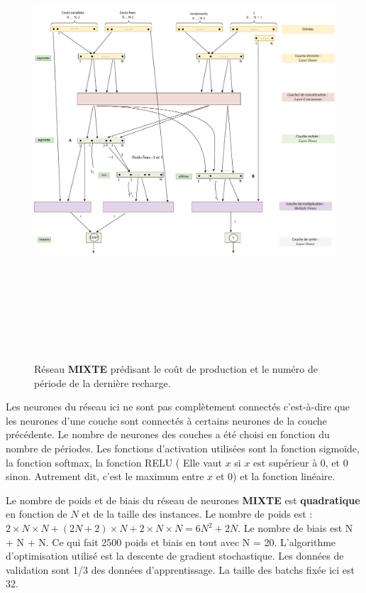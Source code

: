 \begin{figure}[H]
	\centerline{
		\includegraphics[height=17cm]{images_these/FNFC.pdf}}
	\caption[Réseau MIXTE]{Réseau \textbf{MIXTE} prédisant le coût de production et le numéro de période de la dernière recharge.}
	\label{FNFC}
\end{figure}
Les neurones du réseau ici ne sont pas complètement connectés c'est-à-dire que les neurones d'une couche sont connectés à certains neurones de la couche précédente. Le nombre de neurones des couches a été choisi en fonction du nombre de périodes. Les fonctions d'activation utilisées sont la fonction sigmoïde, la fonction softmax, la fonction RELU ( Elle vaut $x$ si $x$ est supérieur à 0, et 0 sinon. Autrement dit, c'est le maximum entre $x$ et 0) et la fonction linéaire. 


Le nombre de poids et de biais du réseau de neurones \textbf{MIXTE} est \textbf{quadratique } en fonction de $N$ et de la taille des instances. Le nombre de poids est : $2\times N\times N + (2N+2)\times N + 2\times N \times N=6N^2+2N$. Le nombre de biais est N + N + N. Ce qui fait 2500 poids et biais en tout avec N = 20.
 L'algorithme d'optimisation utilisé est la descente de gradient stochastique. Les données de validation sont 1/3 des données d'apprentissage. La taille des batchs fixée ici est 32.
 
